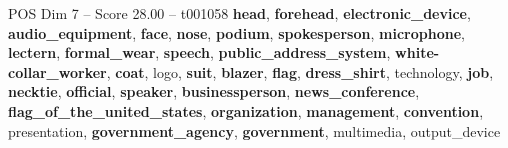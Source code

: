 \begin{textsample}{POS Dim 7 – Score 28.00 – t001058}  \label{ex:f7_pos_018}
\textbf{head}, \textbf{forehead}, \textbf{electronic\_device}, \textbf{audio\_equipment}, \textbf{face}, \textbf{nose}, \textbf{podium}, \textbf{spokesperson}, \textbf{microphone}, \textbf{lectern}, \textbf{formal\_wear}, \textbf{speech}, \textbf{public\_address\_system}, \textbf{white-collar\_worker}, \textbf{coat}, logo, \textbf{suit}, \textbf{blazer}, \textbf{flag}, \textbf{dress\_shirt}, technology, \textbf{job}, \textbf{necktie}, \textbf{official}, \textbf{speaker}, \textbf{businessperson}, \textbf{news\_conference}, \textbf{flag\_of\_the\_united\_states}, \textbf{organization}, \textbf{management}, \textbf{convention}, presentation, \textbf{government\_agency}, \textbf{government}, multimedia, output\_device

\end{textsample}
